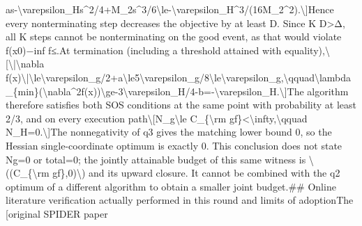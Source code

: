 \documentclass[10pt,a4paper]{article}
\begin{document}
as-\textbackslash{}varepsilon\_\allowbreak{}Hs\textasciicircum{}2/\allowbreak{}4+M\_\allowbreak{}2s\textasciicircum{}3/\allowbreak{}6\newline{}\textbackslash{}le-\textbackslash{}varepsilon\_\allowbreak{}H\textasciicircum{}3/\allowbreak{}(16M\_\allowbreak{}2\textasciicircum{}2).\newline{}\textbackslash{}]\newline{}\newline{}Hence every nonterminating step decreases the objective by at least D. Since K D>{\AtlasUnicodeText Δ}\allowbreak{},\allowbreak{} all K steps cannot be nonterminating on the good event,\allowbreak{} as that would violate f(x0){\AtlasUnicodeSymbols −}\allowbreak{}inf f{\AtlasUnicodeSymbols ≤}\allowbreak{}.\newline{}\newline{}At termination (including a threshold attained with equality),\allowbreak{}\newline{}\textbackslash{}[\newline{}\textbackslash{}|\textbackslash{}nabla f(x)\textbackslash{}|\textbackslash{}le\textbackslash{}varepsilon\_\allowbreak{}g/\allowbreak{}2+a\textbackslash{}le5\textbackslash{}varepsilon\_\allowbreak{}g/\allowbreak{}8\textbackslash{}le\textbackslash{}varepsilon\_\allowbreak{}g,\allowbreak{}\newline{}\textbackslash{}qquad\newline{}\textbackslash{}lambda\_\allowbreak{}\{min\}(\textbackslash{}nabla\textasciicircum{}2f(x))\textbackslash{}ge-3\textbackslash{}varepsilon\_\allowbreak{}H/\allowbreak{}4-b=\allowbreak{}-\textbackslash{}varepsilon\_\allowbreak{}H.\newline{}\textbackslash{}]\newline{}\newline{}The algorithm therefore satisfies both SOS conditions at the same point with probability at least 2/\allowbreak{}3,\allowbreak{} and on every execution path\newline{}\textbackslash{}[\newline{}N\_\allowbreak{}g\textbackslash{}le C\_\allowbreak{}\{\textbackslash{}rm gf\}<\textbackslash{}infty,\allowbreak{}\textbackslash{}qquad N\_\allowbreak{}H=\allowbreak{}0.\newline{}\textbackslash{}]\newline{}The nonnegativity of q3 gives the matching lower bound 0,\allowbreak{} so the Hessian single-coordinate optimum is exactly 0. This conclusion does not state Ng=\allowbreak{}0 or total=\allowbreak{}0;\allowbreak{} the jointly attainable budget of this same witness is \textbackslash{}((C\_\allowbreak{}\{\textbackslash{}rm gf\},\allowbreak{}0)\textbackslash{}) and its upward closure. It cannot be combined with the q2 optimum of a different algorithm to obtain a smaller joint budget.\newline{}\newline{}\#\# Online literature verification actually performed in this round and limits of adoption\newline{}\newline{}The [original SPIDER paper 
\end{document}
